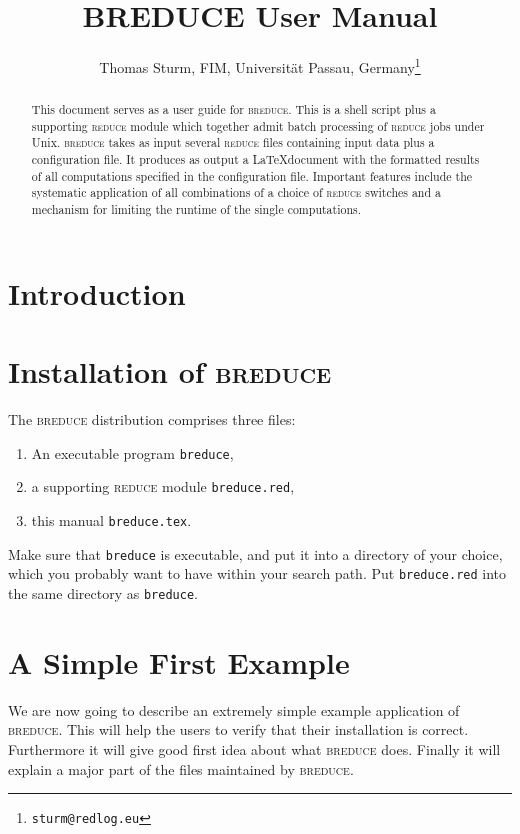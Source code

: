 \documentclass[a4paper]{article}
\begin{document}
\title{\textsc{BREDUCE} User Manual}
\author{Thomas Sturm, FIM, Universit\"at Passau,
  Germany\footnote{\texttt{sturm@redlog.eu}}}
\maketitle

\begin{abstract}
  This document serves as a user guide for \textsc{breduce}. This is a
  shell script plus a supporting \textsc{reduce} module which together
  admit batch processing of \textsc{reduce} jobs under Unix.
  \textsc{breduce} takes as input several \textsc{reduce} files
  containing input data plus a configuration file. It produces as
  output a \LaTeX document with the formatted results of all
  computations specified in the configuration file. Important features
  include the systematic application of all combinations of a choice
  of \textsc{reduce} switches and a mechanism for limiting the runtime
  of the single computations.
\end{abstract}

\section{Introduction}
\cite{Hearn:04}

\section{Installation of \textsc{breduce}}
The \textsc{breduce} distribution comprises three files:
\begin{enumerate}
\item An executable program \texttt{breduce},
\item a supporting \textsc{reduce} module \texttt{breduce.red},
\item this manual \texttt{breduce.tex}.
\end{enumerate}
Make sure that \texttt{breduce} is executable, and put it into a
directory of your choice, which you probably want to have within your
search path. Put \texttt{breduce.red} into the same directory as
\texttt{breduce}.

\section{A Simple First Example}\label{SE:first}
We are now going to describe an extremely simple example application
of \textsc{breduce}. This will help the users to verify that their installation
is correct. Furthermore it will give good first idea about what
\textsc{breduce} does. Finally it will explain a major part of the files
maintained by \textsc{breduce}.
\end{document}
